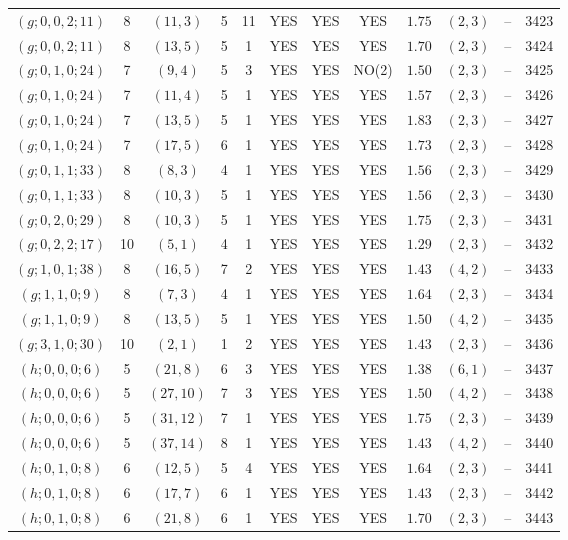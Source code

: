 \begin{longtable}{|c|c|c|c|c|c|c|c|c|c|c|c|}
$(g;0,0,2;11)$ & 8 & $(11,3)$ & 5 & 11 & YES & YES & YES & $1.75$ & $(2,3)$ & -- & 3423\\
$(g;0,0,2;11)$ & 8 & $(13,5)$ & 5 & 1 & YES & YES & YES & $1.70$ & $(2,3)$ & -- & 3424\\
$(g;0,1,0;24)$ & 7 & $(9,4)$ & 5 & 3 & YES & YES & NO(2) & $1.50$ & $(2,3)$ & -- & 3425\\
$(g;0,1,0;24)$ & 7 & $(11,4)$ & 5 & 1 & YES & YES & YES & $1.57$ & $(2,3)$ & -- & 3426\\
$(g;0,1,0;24)$ & 7 & $(13,5)$ & 5 & 1 & YES & YES & YES & $1.83$ & $(2,3)$ & -- & 3427\\
$(g;0,1,0;24)$ & 7 & $(17,5)$ & 6 & 1 & YES & YES & YES & $1.73$ & $(2,3)$ & -- & 3428\\
$(g;0,1,1;33)$ & 8 & $(8,3)$ & 4 & 1 & YES & YES & YES & $1.56$ & $(2,3)$ & -- & 3429\\
$(g;0,1,1;33)$ & 8 & $(10,3)$ & 5 & 1 & YES & YES & YES & $1.56$ & $(2,3)$ & -- & 3430\\
$(g;0,2,0;29)$ & 8 & $(10,3)$ & 5 & 1 & YES & YES & YES & $1.75$ & $(2,3)$ & -- & 3431\\
$(g;0,2,2;17)$ & 10 & $(5,1)$ & 4 & 1 & YES & YES & YES & $1.29$ & $(2,3)$ & -- & 3432\\
$(g;1,0,1;38)$ & 8 & $(16,5)$ & 7 & 2 & YES & YES & YES & $1.43$ & $(4,2)$ & -- & 3433\\
$(g;1,1,0;9)$ & 8 & $(7,3)$ & 4 & 1 & YES & YES & YES & $1.64$ & $(2,3)$ & -- & 3434\\
$(g;1,1,0;9)$ & 8 & $(13,5)$ & 5 & 1 & YES & YES & YES & $1.50$ & $(4,2)$ & -- & 3435\\
$(g;3,1,0;30)$ & 10 & $(2,1)$ & 1 & 2 & YES & YES & YES & $1.43$ & $(2,3)$ & -- & 3436\\
$(h;0,0,0;6)$ & 5 & $(21,8)$ & 6 & 3 & YES & YES & YES & $1.38$ & $(6,1)$ & -- & 3437\\
$(h;0,0,0;6)$ & 5 & $(27,10)$ & 7 & 3 & YES & YES & YES & $1.50$ & $(4,2)$ & -- & 3438\\
$(h;0,0,0;6)$ & 5 & $(31,12)$ & 7 & 1 & YES & YES & YES & $1.75$ & $(2,3)$ & -- & 3439\\
$(h;0,0,0;6)$ & 5 & $(37,14)$ & 8 & 1 & YES & YES & YES & $1.43$ & $(4,2)$ & -- & 3440\\
$(h;0,1,0;8)$ & 6 & $(12,5)$ & 5 & 4 & YES & YES & YES & $1.64$ & $(2,3)$ & -- & 3441\\
$(h;0,1,0;8)$ & 6 & $(17,7)$ & 6 & 1 & YES & YES & YES & $1.43$ & $(2,3)$ & -- & 3442\\
$(h;0,1,0;8)$ & 6 & $(21,8)$ & 6 & 1 & YES & YES & YES & $1.70$ & $(2,3)$ & -- & 3443\\

\end{longtable}
